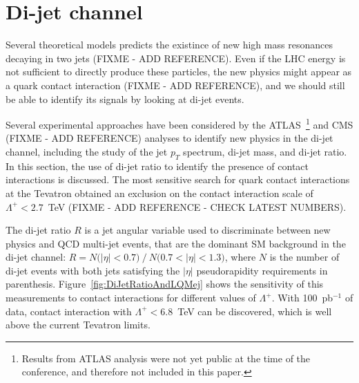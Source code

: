 \documentclass{cimento}
\begin{document}
\section{Di-jet channel} \label{dijet}
Several theoretical models predicts the existince of new 
high mass resonances decaying in two jets (FIXME - ADD REFERENCE).
Even if the LHC energy is not sufficient to directly produce 
these particles, the new physics might appear as 
a quark contact interaction (FIXME - ADD REFERENCE), and we should 
still be able to identify its signals by looking at di-jet events.

Several experimental approaches have been considered by the 
ATLAS~\footnote{Results from ATLAS analysis were not yet public at the time 
of the conference, and therefore not included in this paper.} 
and CMS (FIXME - ADD REFERENCE) analyses to identify new physics 
in the di-jet channel, including the study of the jet 
$p_{T}$ spectrum, di-jet mass, and di-jet ratio.
In this section, the use of di-jet ratio to identify the presence 
of contact interactions is discussed. The most sensitive 
search for quark contact interactions at the Tevatron obtained an exclusion on 
the contact interaction scale of $\Lambda^{+} < 2.7$~TeV (FIXME - ADD REFERENCE - 
CHECK LATEST NUMBERS).  

The di-jet ratio $R$ is a jet angular variable used to 
discriminate between new physics and QCD multi-jet events, 
that are the dominant SM background in the di-jet channel:  
$R=N\mbox{(}|\eta|<0.7\mbox{)}~/~N\mbox{(}0.7<|\eta|< 1.3 \mbox{)}$, 
where $N$ is the number of di-jet events with both jets satisfying the 
$|\eta|$ pseudorapidity requirements in parenthesis. 
Figure~\ref{fig:DiJetRatioAndLQMej} shows the sensitivity of this measurements to 
contact interactions for different values of $\Lambda^{+}$. 
With 100~pb$^{-1}$ of data, contact interaction with
$\Lambda^{+} < 6.8$~TeV can be discovered, 
which is well above the current Tevatron limits.
 
\end{document}
